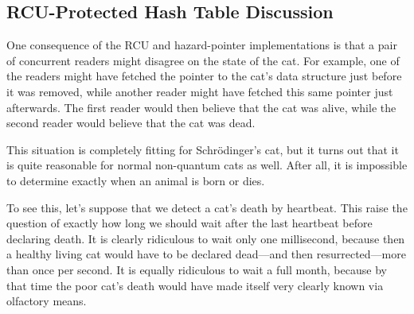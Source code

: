 \QuickQuizEnd

\subsection{RCU-Protected Hash Table Discussion}
\label{sec:datastruct:RCU-Protected Hash Table Discussion}

One consequence of the RCU and hazard-pointer implementations is
that a pair of concurrent readers might disagree on the state of
the cat.
For example, one of the readers might have fetched the pointer to
the cat's data structure just before it was removed, while another
reader might have fetched this same pointer just afterwards.
The first reader would then believe that the cat was alive, while
the second reader would believe that the cat was dead.

This situation is completely fitting for Schr\"odinger's
cat, but it turns out that it is quite reasonable for normal
non-quantum cats as well.
After all, it is impossible to determine exactly when an animal is born
or dies.

To see this, let's suppose that we detect a cat's death by heartbeat.
This raise the question of exactly how long we should wait after the
last heartbeat before declaring death.
It is clearly ridiculous to wait only one millisecond, because then
a healthy living cat would have to be declared dead---and then
resurrected---more than once per second.
It is equally ridiculous to wait a full month, because by that time
the poor cat's death would have made itself very clearly known
via olfactory means.

